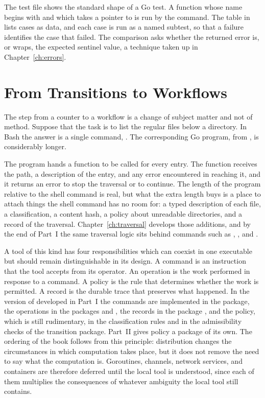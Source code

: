 The test file shows the standard shape of a Go test. A function whose name begins with  and which takes a pointer to  is run by the  command. The table in  lists cases as data, and each case is run as a named subtest, so that a failure identifies the case that failed. The comparison  asks whether the returned error is, or wraps, the expected sentinel value, a technique taken up in Chapter~\ref{ch:errors}.

\section{From Transitions to Workflows}

The step from a counter to a workflow is a change of subject matter and not of method. Suppose that the task is to list the regular files below a directory. In Bash the answer is a single command, . The corresponding Go program, from , is considerably longer.


The program hands  a function to be called for every entry. The function receives the path, a description of the entry, and any error encountered in reaching it, and it returns an error to stop the traversal or  to continue. The length of the program relative to the shell command is real, but what the extra length buys is a place to attach things the shell command has no room for: a typed description of each file, a classification, a content hash, a policy about unreadable directories, and a record of the traversal. Chapter~\ref{ch:traversal} develops those additions, and by the end of Part~I the same traversal logic sits behind commands such as , , and .

A tool of this kind has four responsibilities which can coexist in one executable but should remain distinguishable in its design. A command is an instruction that the tool accepts from its operator. An operation is the work performed in response to a command. A policy is the rule that determines whether the work is permitted. A record is the durable trace that preserves what happened. In the version of \golab{} developed in Part~I the commands are implemented in the  package, the operations in the packages  and , the records in the package , and the policy, which is still rudimentary, in the classification rules and in the admissibility checks of the transition package. Part~II gives policy a package of its own. The ordering of the book follows from this principle: distribution changes the circumstances in which computation takes place, but it does not remove the need to say what the computation is. Goroutines, channels, network services, and containers are therefore deferred until the local tool is understood, since each of them multiplies the consequences of whatever ambiguity the local tool still contains.

